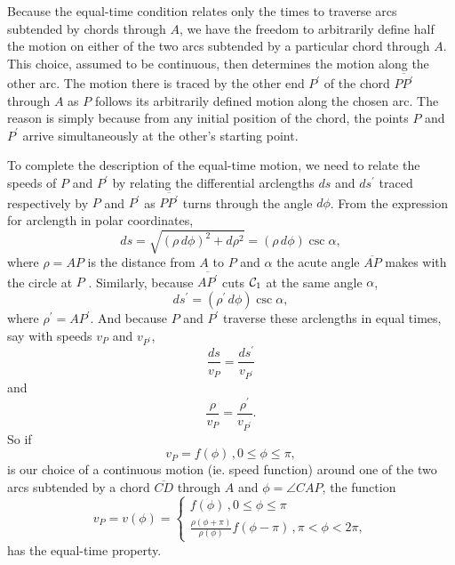 \documentclass{ximera}
\begin{document}
Because the equal-time condition relates only the times to traverse arcs subtended by chords through $A$, we have the freedom to arbitrarily define half the motion on either of the two arcs subtended by a particular chord through $A$. This choice, assumed to be continuous, then determines the motion along the other arc. The motion there is traced by the other end $P^\prime$ of the chord $\overline{PP^\prime}$ through $A$ as $P$ follows its arbitrarily defined motion along the chosen arc. The reason is simply because from any initial position of the chord, the points $P$ and $P^\prime$ arrive simultaneously at the other's starting point.




To complete the description of the equal-time motion, we need to relate the speeds of $P$ and $P^\prime$ by relating the differential arclengths $ds$ and $ds^\prime$ traced respectively by $P$ and $P^\prime$ as $\overline{PP^\prime}$ turns through the angle $d\phi$. From the expression for arclength in polar coordinates,  
\begin{equation}
   ds =  \sqrt{(\rho \, d\phi)^2 + d\rho^2}   =   (\rho \, d\phi) \csc \alpha ,   \label{Eq:ArcLength}
\end{equation}
where $\rho = AP$ is the distance from $A$ to $P$ and $\alpha$ the acute angle $\overline{AP}$ makes with the circle at $P$ . Similarly, because $\overline{AP^\prime}$ cuts ${\cal C}_1$ at the same angle $\alpha$,
\begin{equation}
   ds^\prime =   (\rho^\prime \, d\phi) \csc \alpha ,  \label{Eq:ArcLength2}
\end{equation}
where $\rho^\prime = AP^\prime$. And because $P$ and $P^\prime$ traverse these arclengths in equal times, say with speeds $v_P$ and $v_{P^\prime}$, 
\[
   \frac{ds}{v_P} = \frac{ds^\prime}{v_{P^\prime}}
\] 
and
\begin{equation}
    \frac{\rho}{v_P} = \frac{\rho^\prime}{v_{P^\prime}} .  \label{Eq:SpeedCondition}
\end{equation}
So if 
\[
  v_P = f(\phi) \, , 0\leq \phi \leq \pi , 
\]
is our choice of a continuous motion (ie. speed function) around one of the two arcs subtended by a chord $\overline{CD}$ through $A$ and $\phi = \angle CAP$, the function
\[
   v_P = v(\phi)  = 
\begin{cases}
          f(\phi) \, , 0\leq \phi \leq \pi \\
         \frac{\rho (\phi + \pi)}{\rho (\phi)} f(\phi-\pi) \, , \pi < \phi < 2\pi ,
\end{cases}
\]
has the equal-time property. %
\end{document}
